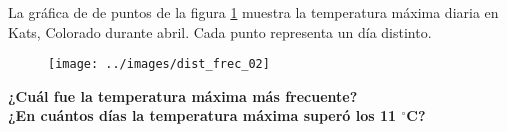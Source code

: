 \question[10] La gráfica de de puntos de la figura \ref{fig:dist_frec_02} muestra la temperatura máxima diaria en Kats, Colorado durante abril.
Cada punto representa un día distinto.
\begin{figure}[H]
    \begin{center}
        \texttt{[image: ../images/dist\_frec\_02]}
    \end{center}
    \caption{}
    \label{fig:dist_frec_02}
\end{figure}
\textbf{¿Cuál fue la temperatura máxima más frecuente?} \\
\textbf{¿En cu\'antos d\'ias la temperatura m\'axima super\'o los 11 $^\circ$C?}